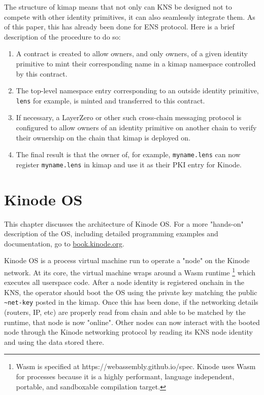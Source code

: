 \documentclass[runningheads]{llncs}
\begin{document}
The structure of kimap means that not only can KNS be designed not to compete with other identity primitives, it can also seamlessly integrate them.
As of this paper, this has already been done for ENS protocol.
Here is a brief description of the procedure to do so:
\begin{enumerate}
    \item A contract is created to allow owners, and only owners, of a given identity primitive to mint their corresponding name in a kimap namespace controlled by this contract.
    \item The top-level namespace entry corresponding to an outside identity primitive, \verb|lens| for example, is minted and transferred to this contract.
    \item If necessary, a LayerZero or other such cross-chain messaging protocol is configured to allow owners of an identity primitive on another chain to verify their ownership on the chain that kimap is deployed on.
    \item The final result is that the owner of, for example, \verb|myname.lens| can now register \verb|myname.lens| in kimap and use it as their PKI entry for Kinode.
\end{enumerate}

%
%
%
\section{Kinode OS}

This chapter discusses the architecture of Kinode OS. For a more "hands-on" description of the OS, including detailed programming examples and documentation, go to \href{https://book.kinode.org/}{book.kinode.org}.

Kinode OS is a process virtual machine run to operate a "node" on the Kinode network.
At its core, the virtual machine wraps around a Wasm runtime
\footnote{Wasm is specified at https://webassembly.github.io/spec. Kinode uses Wasm for processes because it is a highly performant, language independent, portable, and sandboxable compilation target.}
which executes all userspace code.
After a node identity is registered onchain in the KNS, the operator should boot the OS using the private key matching the public \verb|~net-key| posted in the kimap.
Once this has been done, if the networking details (routers, IP, etc) are properly read from chain and able to be matched by the runtime, that node is now "online".
Other nodes can now interact with the booted node through the Kinode networking protocol by reading its KNS node identity and using the data stored there.
\end{document}
